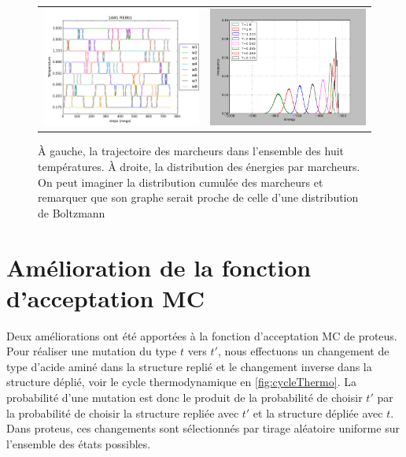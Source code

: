    \begin{figure}[!htbp]
     \centering
     \begin{tabular}{cc}
       \includegraphics[width=8cm]{figure/re8_Ttraj.png}  &
       \includegraphics[width=8cm]{figure/re8_distri.png}  &
     \end{tabular}     
     \caption{ À gauche, la trajectoire des marcheurs dans l'ensemble des huit températures. À droite, la distribution des énergies par marcheurs. On peut imaginer la distribution cumulée des marcheurs et remarquer que son graphe serait proche de celle d'une distribution de Boltzmann}
\label{fig:proteusREMC}
   \end{figure}
   

   \section{Amélioration de la fonction d'acceptation MC}

   Deux améliorations ont été apportées à la fonction d'acceptation MC de proteus. Pour réaliser une mutation du type $t$ vers $t'$, nous effectuons un changement de type d'acide aminé dans la structure replié et le changement inverse dans la structure déplié, voir le cycle thermodynamique en \ref{fig:cycleThermo}. La probabilité d'une mutation est donc le produit de la probabilité de choisir $t'$ par la probabilité de choisir la structure repliée avec $t'$ et la structure dépliée avec $t$. Dans proteus, ces changements sont sélectionnés par tirage aléatoire uniforme sur l'ensemble des états possibles. 

